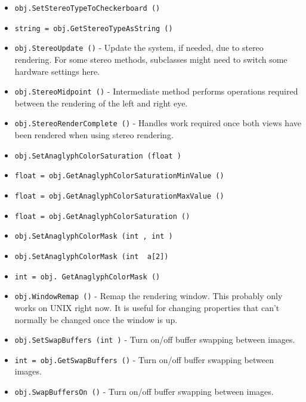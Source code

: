 \begin{itemize}
\item  \verb|obj.SetStereoTypeToCheckerboard ()|

\item  \verb|string = obj.GetStereoTypeAsString ()|

\item  \verb|obj.StereoUpdate ()| -  Update the system, if needed, due to stereo rendering. For some stereo
 methods, subclasses might need to switch some hardware settings here.

\item  \verb|obj.StereoMidpoint ()| -  Intermediate method performs operations required between the rendering
 of the left and right eye.

\item  \verb|obj.StereoRenderComplete ()| -  Handles work required once both views have been rendered when using
 stereo rendering.

\item  \verb|obj.SetAnaglyphColorSaturation (float )|

\item  \verb|float = obj.GetAnaglyphColorSaturationMinValue ()|

\item  \verb|float = obj.GetAnaglyphColorSaturationMaxValue ()|

\item  \verb|float = obj.GetAnaglyphColorSaturation ()|

\item  \verb|obj.SetAnaglyphColorMask (int , int )|

\item  \verb|obj.SetAnaglyphColorMask (int  a[2])|

\item  \verb|int = obj. GetAnaglyphColorMask ()|

\item  \verb|obj.WindowRemap ()| -  Remap the rendering window. This probably only works on UNIX right now.
 It is useful for changing properties that can't normally be changed
 once the window is up.

\item  \verb|obj.SetSwapBuffers (int )| -  Turn on/off buffer swapping between images.

\item  \verb|int = obj.GetSwapBuffers ()| -  Turn on/off buffer swapping between images.

\item  \verb|obj.SwapBuffersOn ()| -  Turn on/off buffer swapping between images.


\end{itemize}
